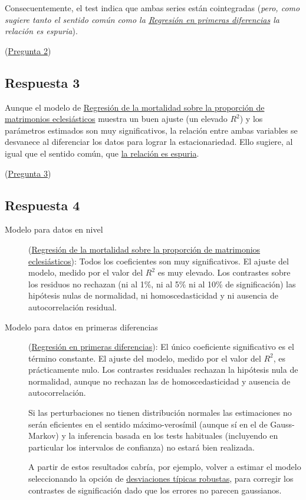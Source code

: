 \documentclass[10pt]{article}
\begin{document}
Consecuentemente, el test indica que ambas series están cointegradas
(\emph{pero, como sugiere tanto el sentido común como la \hyperref[sec:orgcd199e9]{Regresión en primeras diferencias} la relación es espuria}).

(\hyperref[sec:orgec6b67f]{Pregunta 2})
\subsection*{Respuesta 3}
\label{sec:org347cdd3}

Aunque el modelo de \hyperref[sec:orgd690bd3]{Regresión de la mortalidad sobre la proporción de matrimonios eclesiásticos} muestra un buen ajuste (un elevado \(R^2\)) y
los parámetros estimados son muy significativos, la relación entre
ambas variables se desvanece al diferenciar los datos para lograr la
estacionariedad. Ello sugiere, al igual que el sentido común, que \uline{la
relación es espuria}.

(\hyperref[sec:org69e2217]{Pregunta 3})
\subsection*{Respuesta 4}
\label{sec:org29be2bb}

\begin{description}
\item[{Modelo para datos en nivel}] (\hyperref[sec:orgd690bd3]{Regresión de la mortalidad sobre la proporción de matrimonios eclesiásticos}): Todos los coeficientes son
muy significativos. El ajuste del modelo, medido por el valor del
\(R^2\) es muy elevado. Los contrastes sobre los residuos no
rechazan (ni al 1\%, ni al 5\% ni al 10\% de significación) las
hipótesis nulas de normalidad, ni homoscedasticidad y ni ausencia de
autocorrelación residual.

\item[{Modelo para datos en primeras diferencias}] (\hyperref[sec:orgcd199e9]{Regresión en primeras diferencias}): El único coeficiente significativo es el término
constante. El ajuste del modelo, medido por el valor del \(R^2\), es
prácticamente nulo. Los contrastes residuales rechazan la hipótesis
nula de normalidad, aunque no rechazan las de homoscedasticidad y
ausencia de autocorrelación. 

Si las perturbaciones no tienen distribución normales las
estimaciones no serán eficientes en el sentido máximo-verosímil
(aunque sí en el de Gauss-Markov) y la inferencia basada en los
tests habituales (incluyendo en particular los intervalos de
confianza) no estará bien realizada.

A partir de estos resultados cabría, por ejemplo, volver a estimar
el modelo seleccionando la opción de \uline{desviaciones típicas
robustas}, para corregir los contrastes de significación dado que
los errores no parecen gaussianos.
\end{description}
\end{document}
